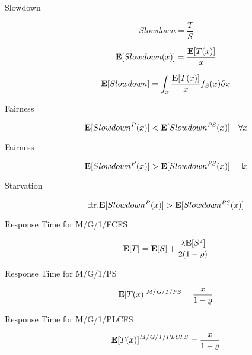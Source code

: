 \begin{description}

	\item [Slowdown]
		\begin{equation}
		Slowdown=\frac{T}{S}
		\end{equation}
		
		\begin{equation}
		\mathbf{E}[Slowdown(x)]=\frac{\mathbf{E}[T(x)]}{x}
		\end{equation}
		
		\begin{equation}
		\mathbf{E}[Slowdown]=\int_{x}\frac{\mathbf{E}[T(x)]}{x}f_{S}(x)\partial x
		\end{equation}
		
	\item [Fairness]
		\begin{equation}
		\mathbf{E}[Slowdown^{\mathit{P}}(x)]<\mathbf{E}[Slowdown^{\mathit{PS}}(x)]\quad\forall x
		\end{equation}
		
	\item [Fairness]
		\begin{equation}
		\mathbf{E}[Slowdown^{\mathit{P}}(x)]>\mathbf{E}[Slowdown^{\mathit{PS}}(x)]\quad\exists x
		\end{equation}
		
	\item [Starvation]
		\begin{equation}
		\exists x.\mathbf{E}[Slowdown^{\mathit{P}}(x)]>\mathbf{E}[Slowdown^{\mathit{PS}}(x)]
		\end{equation}
		
	\item [Response Time for M/G/1/FCFS]
		\begin{equation}
		\mathbf{E}[T]=\mathbf{E}[S]+\frac{\lambda\mathbf{E}[S^{2}]}{2(1-\varrho)}
		\end{equation} 
		
	\item [Response Time for M/G/1/PS]
		\begin{equation}
		\mathbf{E}[T(x)]^{\mathit{M/G/1/PS}}=\frac{x}{1-\varrho}
		\end{equation}
		
	\item [Response Time for M/G/1/PLCFS]
		\begin{equation}
		\mathbf{E}[T(x)]^{\mathit{M/G/1/PLCFS}}=\frac{x}{1-\varrho}
		\end{equation}
		

\end{description}
